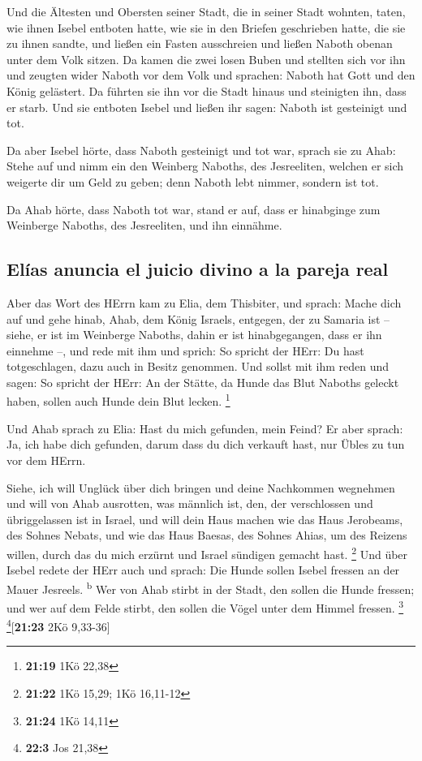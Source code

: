  Und die Ältesten und Obersten seiner Stadt, die in
seiner Stadt wohnten, taten, wie ihnen Isebel entboten hatte, wie sie in
den Briefen geschrieben hatte, die sie zu ihnen sandte, 
und ließen ein Fasten ausschreien und ließen Naboth obenan unter dem
Volk sitzen.  Da kamen die zwei losen Buben und stellten
sich vor ihn und zeugten wider Naboth vor dem Volk und sprachen: Naboth
hat Gott und den König gelästert. Da führten sie ihn vor die Stadt
hinaus und steinigten ihn, dass er starb.  Und sie
entboten Isebel und ließen ihr sagen: Naboth ist gesteinigt und tot.

 Da aber Isebel hörte, dass Naboth gesteinigt und tot
war, sprach sie zu Ahab: Stehe auf und nimm ein den Weinberg Naboths,
des Jesreeliten, welchen er sich weigerte dir um Geld zu geben; denn
Naboth lebt nimmer, sondern ist tot.

 Da Ahab hörte, dass Naboth tot war, stand er auf, dass
er hinabginge zum Weinberge Naboths, des Jesreeliten, und ihn einnähme.

\hypertarget{eluxedas-anuncia-el-juicio-divino-a-la-pareja-real}{%
\subsection{Elías anuncia el juicio divino a la pareja
real}\label{eluxedas-anuncia-el-juicio-divino-a-la-pareja-real}}

 Aber das Wort des HErrn kam zu Elia, dem Thisbiter, und
sprach:  Mache dich auf und gehe hinab, Ahab, dem König
Israels, entgegen, der zu Samaria ist -- siehe, er ist im Weinberge
Naboths, dahin er ist hinabgegangen, dass er ihn einnehme --,
 und rede mit ihm und sprich: So spricht der HErr: Du
hast totgeschlagen, dazu auch in Besitz genommen. Und sollst mit ihm
reden und sagen: So spricht der HErr: An der Stätte, da Hunde das Blut
Naboths geleckt haben, sollen auch Hunde dein Blut lecken. \footnote{\textbf{21:19}
  1Kö 22,38}

 Und Ahab sprach zu Elia: Hast du mich gefunden, mein
Feind? Er aber sprach: Ja, ich habe dich gefunden, darum dass du dich
verkauft hast, nur Übles zu tun vor dem HErrn.

 Siehe, ich will Unglück über dich bringen und deine
Nachkommen wegnehmen und will von Ahab ausrotten, was männlich ist, den,
der verschlossen und übriggelassen ist in Israel,  und
will dein Haus machen wie das Haus Jerobeams, des Sohnes Nebats, und wie
das Haus Baesas, des Sohnes Ahias, um des Reizens willen, durch das du
mich erzürnt und Israel sündigen gemacht hast. \footnote{\textbf{21:22}
  1Kö 15,29; 1Kö 16,11-12}  Und über Isebel redete der
HErr auch und sprach: Die Hunde sollen Isebel fressen an der Mauer
Jesreels. \textsuperscript{b}  Wer von Ahab stirbt in der
Stadt, den sollen die Hunde fressen; und wer auf dem Felde stirbt, den
sollen die Vögel unter dem Himmel fressen. \footnote{\textbf{21:24} 1Kö
  14,11} \footnote{\textbf{22:3} Jos 21,38}{[}\textbf{21:23} 2Kö
9,33-36{]}

